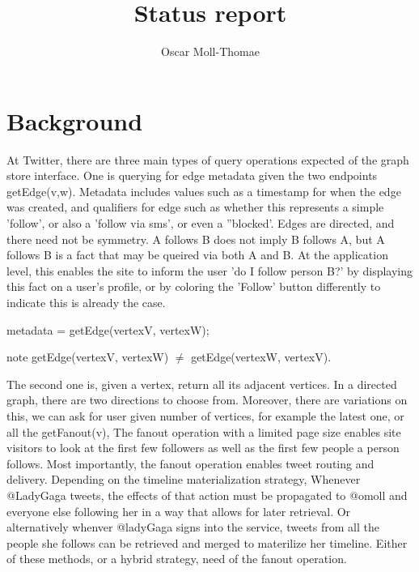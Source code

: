 \documentclass[11pt]{article}
\author{Oscar Moll-Thomae}
\title{Status report}
\begin{document}
\maketitle


\newcommand{\code}{\ttfamily}

\newcommand{\edgeq}{{\code getEdge()}}
\newcommand{\fanoutq}[1][]{{\code getFanout(}~#1~{\code )}}
\newcommand{\intersectq}{{\code getIntersection()}}
\newcommand{\randomwalk}{{\code randomWalk()}}



\section{Background}

At Twitter, there are three main types of query operations expected of the graph store interface. One is querying for edge metadata given the two endpoints {\code getEdge(v,w)}. Metadata includes values such as a timestamp for when the edge was created, and qualifiers for edge such as whether this represents a simple 'follow', or also a  'follow via sms', or even a ''blocked'. Edges are directed, and there need not be symmetry.  A follows B does not imply B follows A, but A follows B is a fact that may be queired via both A and B. At the application level, this enables the site to inform the user  'do I follow person B?' by displaying this fact on a user's profile, or by coloring the 'Follow' button differently to indicate this is already the case.   

metadata = getEdge(vertexV, vertexW);

note getEdge(vertexV, vertexW) $\neq$ getEdge(vertexW, vertexV).


The second one is, given a vertex, return all its adjacent vertices. In a directed graph, there are two directions
to choose from. Moreover, there are variations on this, we can ask for user given number of vertices, for example the latest one, or all the   {\code getFanout(v)}, The fanout operation with a limited page size enables site visitors to look at the first few followers as well as the first few people a person follows.   Most importantly, the fanout operation enables tweet routing and delivery. Depending on the timeline materialization strategy, Whenever @LadyGaga tweets, the effects of that action must be propagated to @omoll and  everyone else following her in a way that allows for later retrieval.  Or alternatively whenver @ladyGaga signs into the service, tweets from all the people she follows can be retrieved and merged to materilize her timeline. Either of these methods, or a hybrid strategy, need of the fanout operation.
\end{document}
